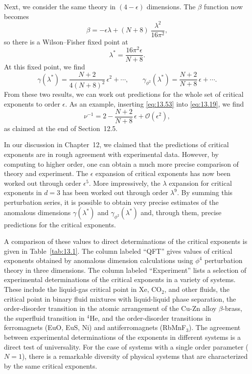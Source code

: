 Next, we consider the same theory in $(4-\epsilon)$ dimensions.  The $\beta$
function now becomes
\begin{equation}
  \beta = -\epsilon\lambda + (N+8)\ \frac{\lambda^2}{16\pi^2} ,
  \label{eq:13.51}
\end{equation}
so there is a Wilson--Fisher fixed point at
\begin{equation}
  \lambda^{*} = \frac{16\pi^2\epsilon}{N+8} .
  \label{eq:13.52}
\end{equation}
At this fixed point, we find
\begin{equation}
  \gamma(\lambda^{*}) = \frac{N+2}{4(N+8)^2}\,\epsilon^2 + \cdots,\qquad
  \gamma_{\phi^2}(\lambda^{*}) = \frac{N+2}{N+8}\,\epsilon + \cdots .
  \label{eq:13.53}
\end{equation}
From these two results, we can work out predictions for the whole set of
critical exponents to order $\epsilon$.  As an example, inserting
\eqref{eq:13.53} into \eqref{eq:13.19}, we find
\begin{equation}
  \nu^{-1} = 2 - \frac{N+2}{N+8}\,\epsilon + \mathcal{O}(\epsilon^2) ,
  \label{eq:13.54}
\end{equation}
as claimed at the end of Section~12.5.

In our discussion in Chapter~12, we claimed that the predictions of critical
exponents are in rough agreement with experimental data.  However, by
computing to higher order, one can obtain a much more precise comparison of
theory and experiment.  The $\epsilon$ expansion of critical exponents has now
been worked out through order $\epsilon^5$.  More impressively, the
$\lambda$ expansion for critical exponents in $d = 3$ has been worked out
through order $\lambda^9$.  By summing this perturbation series, it is
possible to obtain very precise estimates of the anomalous dimensions
$\gamma(\lambda^{*})$ and $\gamma_{\phi^2}(\lambda^{*})$ and, through them,
precise predictions for the critical exponents.

A comparison of these values to direct determinations of the critical
exponents is given in Table~\ref{tab:13.1}.  The column labeled ``QFT'' gives
values of critical exponents obtained by anomalous dimension calculations
using $\phi^4$ perturbation theory in three dimensions.  The column labeled
``Experiment'' lists a selection of experimental determinations of the
critical exponents in a variety of systems.  These include the liquid-gas
critical point in Xe, CO$_2$, and other fluids, the critical point in binary
fluid mixtures with liquid-liquid phase separation, the order-disorder
transition in the atomic arrangement of the Cu-Zn alloy $\beta$-brass, the
superfluid transition in $^4$He, and the order-disorder transitions in
ferromagnets (EuO, EuS, Ni) and antiferromagnets (RbMnF$_3$).  The agreement
between experimental determinations of the exponents in different systems is
a direct test of universality.  For the case of systems with a single order
parameter ($N = 1$), there is a remarkable diversity of physical systems that
are characterized by the same critical exponents.

